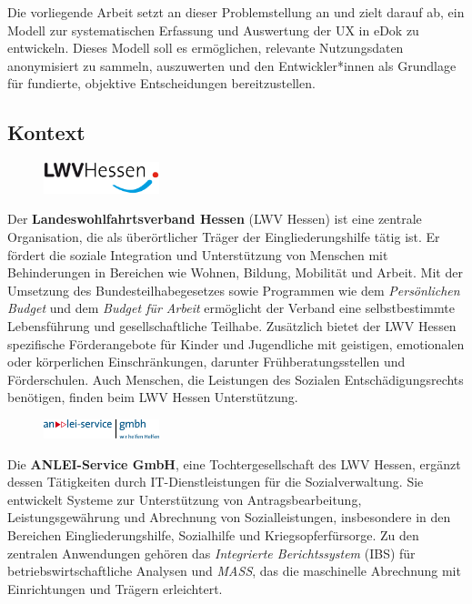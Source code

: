 \documentclass[12pt,oneside]{article}
\begin{document}
Die vorliegende Arbeit setzt an dieser Problemstellung an und zielt darauf ab, ein Modell zur systematischen Erfassung und Auswertung der UX in eDok zu entwickeln. Dieses Modell soll es ermöglichen, relevante Nutzungsdaten anonymisiert zu sammeln, auszuwerten und den Entwickler*innen als Grundlage für fundierte, objektive Entscheidungen bereitzustellen.

\subsection{Kontext}
\begin{figure} %
    \includegraphics[width=0.3\textwidth]{lwv.png} %
\end{figure}
Der \textbf{Landeswohlfahrtsverband Hessen} (LWV Hessen) ist eine zentrale Organisation, die als überörtlicher Träger der Eingliederungshilfe tätig ist. Er fördert die soziale Integration und Unterstützung von Menschen mit Behinderungen in Bereichen wie Wohnen, Bildung, Mobilität und Arbeit. Mit der Umsetzung des Bundesteilhabegesetzes sowie Programmen wie dem \textit{Persönlichen Budget} und dem \textit{Budget für Arbeit} ermöglicht der Verband eine selbstbestimmte Lebensführung und gesellschaftliche Teilhabe. Zusätzlich bietet der LWV Hessen spezifische Förderangebote für Kinder und Jugendliche mit geistigen, emotionalen oder körperlichen Einschränkungen, darunter Frühberatungsstellen und Förderschulen. Auch Menschen, die Leistungen des Sozialen Entschädigungsrechts benötigen, finden beim LWV Hessen Unterstützung.
\begin{figure} %
    \includegraphics[width=0.3\textwidth]{anlei.png} %
\end{figure}
Die \textbf{ANLEI-Service GmbH}, eine Tochtergesellschaft des LWV Hessen, ergänzt dessen Tätigkeiten durch IT-Dienstleistungen für die Sozialverwaltung. Sie entwickelt Systeme zur Unterstützung von Antragsbearbeitung, Leistungsgewährung und Abrechnung von Sozialleistungen, insbesondere in den Bereichen Eingliederungshilfe, Sozialhilfe und Kriegsopferfürsorge. Zu den zentralen Anwendungen gehören das \textit{Integrierte Berichtssystem} (IBS) für betriebswirtschaftliche Analysen und \textit{MASS}, das die maschinelle Abrechnung mit Einrichtungen und Trägern erleichtert.
\end{document}
